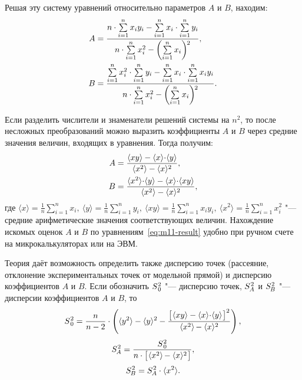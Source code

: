 \documentclass[a4paper, 12pt]{extarticle}
\newcommand{\isum}{\sum\limits_{i=1}^{n}}
\newcommand{\SZS}{S_{\kern.1em 0}^{\kern.05em 2}}
\newcommand{\SAS}{S_{\kern-.053em A}^{\kern.05em 2}}
\newcommand{\SBS}{S_{\kern-.058em B}^{\kern.05em 2}}
\newcommand{\angled}[1]{\ensuremath{\langle #1 \rangle}}
\newcommand{\meanx}{\ensuremath{\angled{x}}}
\newcommand{\meany}{\ensuremath{\angled{y}}}
\newcommand{\meanxy}{\ensuremath{\angled{xy}}}
\newcommand{\meanxs}{\ensuremath{\angled{x^2}}}
\newcommand{\meanys}{\ensuremath{\angled{y^2}}}
\newcommand{\ccdot}{\kern-0.21em \cdot \kern-0.21em}
\begin{document}
Решая эту систему уравнений относительно параметров $A$ и $B$, находим:
\begin{equation}
\label{eq:m11-solution}
\aligned
A &= \frac{n \cdot \isum x_i y_i - \isum x_i \cdot \isum y_i}{n \cdot \isum x_i^2 - \left( \isum x_i \right){\kern -.25em\vphantom{\Big(}}^2}, \\
B &= \frac{\isum x_i^2 \cdot \isum y_i - \isum x_i \cdot \isum x_i y_i}{n \cdot \isum x_i^2 - \left( \isum x_i \right){\kern -.25em\vphantom{\Big(}}^2}. %
\endaligned
\end{equation}

Если разделить числители и знаменатели решений системы на $n^2$, то после несложных преобразований можно выразить коэффициенты $A$ и $B$ через средние значения величин, входящих в уравнения. Тогда получим: %
\begin{equation}
\label{eq:m11-result}
\aligned
A &= \frac{\meanxy - \meanx \ccdot \meany}{\meanxs - \meanx^2}, \\
B &= \frac{\meanxs \ccdot \meany - \meanx \ccdot \meanxy}{\meanxs - \meanx^2},
\endaligned
\end{equation}
где
$
\meanx = \frac{1}{n} \isum x_i, \ \meany = \frac{1}{n} \isum y_i, \ \meanxy = \frac{1}{n} \isum x_i y_i, \ \meanxs = \frac{1}{n}  \isum x_i^2
$
"--- средние арифметические значения соответствующих величин. Нахождение искомых оценок $A$ и $B$ по уравнениям~\eqref{eq:m11-result} удобно при ручном счете на микрокалькуляторах или на ЭВМ.

\pagebreak


Теория даёт возможность определить также дисперсию точек (рассеяние, отклонение экспериментальных точек от модельной прямой) и дисперсию коэффициентов $A$ и $B$. Если обозначить $\SZS$ "--- дисперсию точек, $\SAS$  и $\SBS$  "--- дисперсии коэффициентов $A$ и $B$, то %
\begin{equation}
\label{eq:m11-S_0^2} %
\SZS = \frac{n}{n - 2} \cdot \left( \meanys - \meany^2 - \frac{\big[ \hspace{.7pt} \meanxy  - \meanx \ccdot \meany \hspace{.7pt} \big] ^2}{\meanxs \kern-.08em - \meanx^2} \right), %
\end{equation}
\begin{equation}
\label{eq:m11-S_A^2}
\SAS =\frac{\SZS}{n \cdot \big[ \hspace{.7pt} \meanxs \kern-.08em - \meanx^2 \hspace{.7pt} \big]},
\end{equation}
\begin{equation}
\label{eq:m11-S_B^2}
\SBS = \SAS \cdot \meanxs.
\end{equation}
\end{document}
